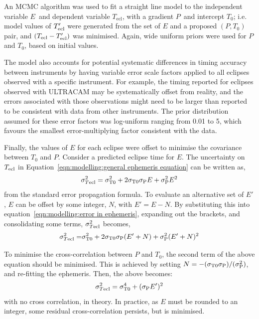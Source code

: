 An MCMC algorithm was used to fit a straight line model to the independent variable $E$\ and dependent variable $T_\mathrm{ecl}$, with a gradient $P$\ and intercept $T_0$; i.e. model values of $T'_{\rm ecl}$ were generated from the set of $E$ and a proposed $(P, T_0)$ pair, and $(T_{\rm ecl} - T'_{\rm ecl})$ was minimised. Again, wide uniform priors were used for $P$ and $T_0$, based on initial values.

The model also accounts for potential systematic differences in timing accuracy between instruments by having variable error scale factors applied to all eclipses observed with a specific instrument. For example, the timing reported for eclipses observed with ULTRACAM may be systematically offset from reality, and the errors associated with those observations might need to be larger than reported to be consistent with data from other instruments. The prior distribution assumed for these error factors was log-uniform ranging from 0.01 to 5, which favours the smallest error-multiplying factor consistent with the data.

Finally, the values of $E$ for each eclipse were offset to minimise the covariance between $T_0$ and $P$.
Consider a predicted eclipse time for $E$. The uncertainty on $T_{\rm ecl}$ in Equation~\ref{eqn:modelling:general ephemeris equation} can be written as,
\begin{equation}
    \label{eqn:modelling:error in ephemeris}
    \sigma_{T{\rm ecl}}^2 = \sigma_{\rm T0}^2 + 2\sigma_{\rm T0} \sigma_{\rm P}E + \sigma_{\rm P}^2 E^2
\end{equation}
from the standard error propagation formula.
To evaluate an alternative set of $E'$, $E$ can be offset by some integer, $N$, with $E' = E - N$. By substituting this into equation~\ref{eqn:modelling:error in ephemeris}, expanding out the brackets, and consolidating some terms, $\sigma_{T{\rm ecl}}^2$ becomes,
\begin{align*}
    \sigma_{T{\rm ecl}}^2 =& \sigma_{\rm T0}^2 + 2\sigma_{\rm T0} \sigma_{\rm P}(E'+N) + \sigma_{\rm P}^2 (E'+N)^2 \\
\end{align*}

To minimise the cross-correlation between $P$ and $T_0$, the second term of the above equation should be minimised.
This is achieved by setting $N = -(\sigma_{\rm T0}\sigma_{\rm P})/(\sigma_{\rm P}^2)$, and re-fitting the ephemeris. Then, the above becomes:
\begin{equation}
    \sigma_{T{\rm ecl}}^2 = \sigma_{\rm T0}^4 + (\sigma_{\rm P}E')^2
\end{equation}
with no cross correlation, in theory. In practice, as $E$ must be rounded to an integer, some residual cross-correlation persists, but is minimised.

